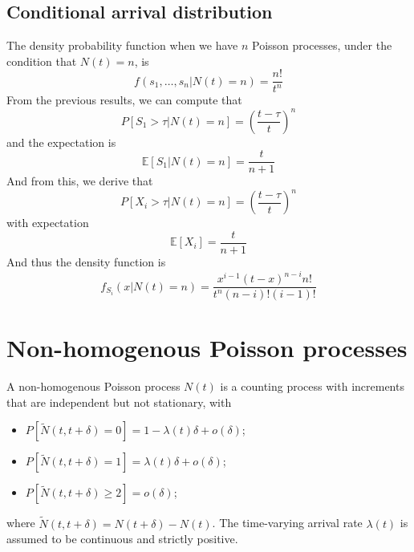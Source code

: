 \documentclass[12pt, openany]{report}
\newcommand{\E}{\mathbb{E}}
\theoremstyle{definition}
\begin{document}
\subsection{Conditional arrival distribution}
The density probability function when we have $n$ Poisson processes, under the condition that $N(t)=n$, is
\begin{equation}
  f(s_1,\dots,s_n|N(t)=n)=\frac{n!}{t^n}
\end{equation}
From the previous results, we can compute that 
\begin{equation}
  P[S_1>\tau|N(t)=n]=\left(\frac{t-\tau}{t}\right)^n
\end{equation}
and the expectation is 
\begin{equation}
  \E[S_1|N(t)=n] = \frac{t}{n+1}
\end{equation}
And from this, we derive that 
\begin{equation}
  P[X_i>\tau|N(t)=n] = \left(\frac{t-\tau}{t}\right)^n
\end{equation}
with expectation 
\begin{equation}
  \E[X_i] = \frac{t}{n+1}
\end{equation}
And thus the density function is 
\begin{equation}
  f_{S_i}(x|N(t)=n) = \frac{x^{i-1}(t-x)^{n-i}n!}{t^n (n-i)!(i-1)!}
\end{equation}
\section{Non-homogenous Poisson processes}
A non-homogenous Poisson process $N(t)$ is a counting process with increments that are independent but not stationary, with
\begin{itemize}
  \item $P[\tilde N(t,t+\delta)=0]=1-\lambda (t)\delta + o(\delta)$;
  \item $P[\tilde N(t,t+\delta)=1]=\lambda (t)\delta + o(\delta)$;
  \item $P[\tilde N(t,t+\delta)\ge2]=o(\delta)$;
\end{itemize}
where $\tilde N(t,t+\delta)=N(t+\delta)-N(t)$. The time-varying arrival rate $\lambda(t)$ is assumed to be continuous and strictly positive.
\end{document}
